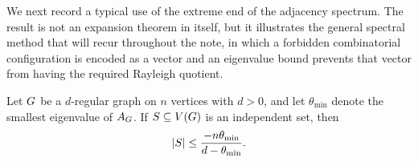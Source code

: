 We next record a typical use of the extreme end of the adjacency spectrum. The result is not an expansion theorem in itself, but it illustrates the general spectral method that will recur throughout the note, in which a forbidden combinatorial configuration is encoded as a vector and an eigenvalue bound prevents that vector from having the required Rayleigh quotient.

\begin{theorem}
	\label{thm:hoffman-bound}
	Let \(G\) be a \(d\)-regular graph on \(n\) vertices with \(d>0\), and let \(\theta_{\min}\) denote the smallest eigenvalue of \(A_{G}\). If \(S\subseteq V(G)\) is an independent set, then
	\begin{equation}
		\lvert S\rvert\leq \frac{-n\theta_{\min}}{d-\theta_{\min}}.
	\end{equation}
\end{theorem}

